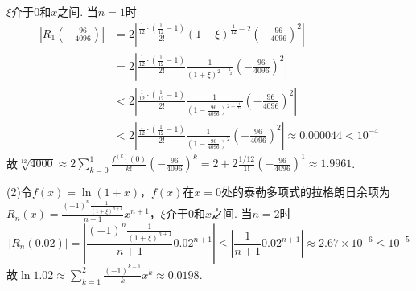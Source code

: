\documentclass[12pt,UTF8]{ctexart}
\begin{document}
\begin{enumerate}
$\xi$介于$0$和$x$之间. 当$n=1$时
\[\begin{aligned}
|R_1(-\frac{96}{4096})|&=2|\frac{\frac1{12}\cdot(\frac1{12}-1)}{2!}(1+\xi)^{\frac1{12}-2}(-\frac{96}{4096})^2|\\
&=2|\frac{\frac1{12}\cdot(\frac1{12}-1)}{2!}\frac1{(1+\xi)^{2-\frac1{12}}}(-\frac{96}{4096})^2|\\
&<2|\frac{\frac1{12}\cdot(\frac1{12}-1)}{2!}\frac1{(1-\frac{96}{4096})^{2-\frac1{12}}}(-\frac{96}{4096})^2|\\
&<2|\frac{\frac1{12}\cdot(\frac1{12}-1)}{2!}\frac1{(1-\frac{96}{4096})^2}(-\frac{96}{4096})^2|\approx0.000044<10^{-4}
\end{aligned}\]
故$\sqrt[12]{4000}\approx2\sum_{k=0}^1\frac{f^{(k)}(0)}{k!}(-\frac{96}{4096})^k=2+2\frac{1/12}{1!}(-\frac{96}{4096})^1\approx1.9961$.

(2)令$f(x)=\ln(1+x)$，$f(x)$在$x=0$处的泰勒多项式的拉格朗日余项为\\$R_n(x)=\frac{(-1)^n\frac1{(1+\xi)^{n+1}}}{n+1}x^{n+1}$，$\xi$介于$0$和$x$之间. 当$n=2$时
\[
|R_n(0.02)|=|\frac{(-1)^n\frac1{(1+\xi)^{n+1}}}{n+1}0.02^{n+1}|\leq|\frac1{n+1}0.02^{n+1}|\approx2.67\times10^{-6}\leq10^{-5}
\]
故$\ln1.02\approx\sum_{k=1}^2\frac{(-1)^{k-1}}kx^k\approx0.0198$.
\end{enumerate}
\end{document}
